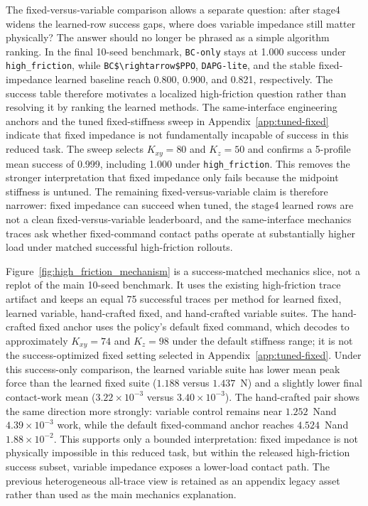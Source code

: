 ﻿\documentclass[11pt]{article}
\newcommand{\code}[1]{\nolinkurl{#1}}
\newcommand{\N}{\ensuremath{\mathrm{N}}}
\begin{document}
The fixed-versus-variable comparison allows a separate question: after stage4 widens the learned-row
success gaps, where does variable impedance still matter physically? The answer should no longer be
phrased as a simple algorithm ranking. In the final 10-seed benchmark, \code{BC-only} stays at
1.000 success under \code{high\_friction}, while \code{BC$\rightarrow$PPO}, \code{DAPG-lite}, and
the stable fixed-impedance learned baseline reach 0.800, 0.900, and 0.821, respectively. The
success table therefore motivates a localized high-friction question rather than resolving it by
ranking the learned methods.
The same-interface engineering anchors and the tuned fixed-stiffness sweep in
Appendix~\ref{app:tuned-fixed} indicate that fixed impedance is not fundamentally incapable of
success in this reduced task. The sweep selects $K_{xy}=80$ and $K_z=50$ and confirms a
5-profile mean success of 0.999, including 1.000 under \code{high\_friction}. This removes the
stronger interpretation that fixed impedance only fails because the midpoint stiffness is untuned.
The remaining fixed-versus-variable claim is therefore narrower: fixed impedance can succeed when
tuned, the stage4 learned rows are not a clean fixed-versus-variable leaderboard, and the
same-interface mechanics traces ask whether fixed-command contact paths operate at substantially
higher load under matched successful high-friction rollouts.

Figure~\ref{fig:high_friction_mechanism} is a success-matched mechanics slice, not a replot of the
main 10-seed benchmark. It uses the existing high-friction trace artifact and keeps an equal
75 successful traces per method for learned fixed, learned variable, hand-crafted fixed, and
hand-crafted variable suites. The hand-crafted fixed anchor uses the policy's default fixed
command, which decodes to approximately $K_{xy}=74$ and $K_z=98$ under the default stiffness range;
it is not the success-optimized fixed setting selected in Appendix~\ref{app:tuned-fixed}. Under
this success-only comparison, the learned variable suite has lower mean peak force than the learned
fixed suite ($1.188$ versus $1.437$~\N) and a slightly lower final contact-work mean
($3.22\times 10^{-3}$ versus $3.40\times 10^{-3}$). The hand-crafted pair shows the same direction
more strongly: variable control remains near $1.252$~\N and $4.39\times 10^{-3}$ work, while the
default fixed-command anchor reaches $4.524$~\N and $1.88\times 10^{-2}$. This supports only a
bounded interpretation: fixed impedance is not physically impossible in this reduced task, but
within the released high-friction success subset, variable impedance exposes a lower-load contact
path. The previous heterogeneous all-trace view is retained as an appendix legacy asset rather
than used as the main mechanics explanation.
\end{document}
